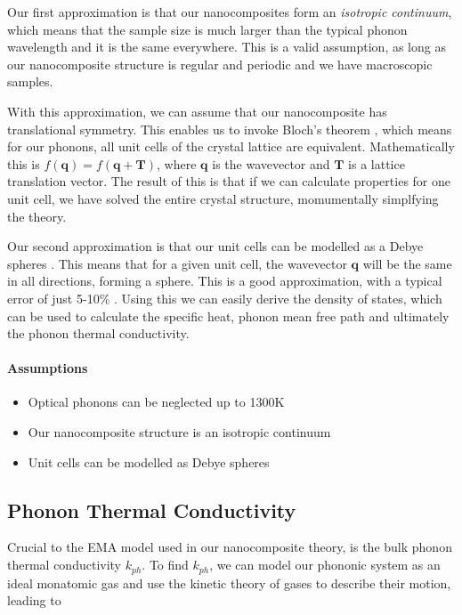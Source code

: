 \documentclass[12pt]{article}
\renewcommand{\vec}[1]{\mathbf{#1}}
\begin{document}
Our first approximation is that our nanocomposites form an \emph{isotropic continuum}, which means that the sample size is much larger than the typical phonon wavelength and it is the same everywhere. This is a valid assumption, as long as our nanocomposite structure is regular and periodic and we have macroscopic samples.

With this approximation, we can assume that our nanocomposite has translational symmetry. This enables us to invoke Bloch's theorem \cite{kittel}, which means for our phonons, all unit cells of the crystal lattice are equivalent. Mathematically this is $f(\vec{q}) = f(\vec{q} + \vec{T})$, where $\vec{q}$ is the wavevector and $\vec{T}$ is a lattice translation vector. The result of this is that if we can calculate properties for one unit cell, we have solved the entire crystal structure, momumentally simplfying the theory.

Our second approximation is that our unit cells can be modelled as a Debye spheres \cite{kittel}. This means that for a given unit cell, the wavevector $\vec{q}$ will be the same in all directions, forming a sphere. This is a good approximation, with a typical error of just 5-10\% \cite{gp}. Using this we can easily derive the density of states, which can be used to calculate the specific heat, phonon mean free path and ultimately the phonon thermal conductivity.

\paragraph{Assumptions}
\begin{itemize}
  \item Optical phonons can be neglected up to 1300K
  \item Our nanocomposite structure is an isotropic continuum
  \item Unit cells can be modelled as Debye spheres
\end{itemize}

\subsection{Phonon Thermal Conductivity}
\label{sec:phonon-thermal}
Crucial to the EMA model \cite{ema} used in our nanocomposite theory, is the bulk phonon thermal conductivity $k_{ph}$. To find $k_{ph}$, we can model our phononic system as an ideal monatomic gas and use the kinetic theory of gases to describe their motion, leading to \cite{kittel}
\end{document}
